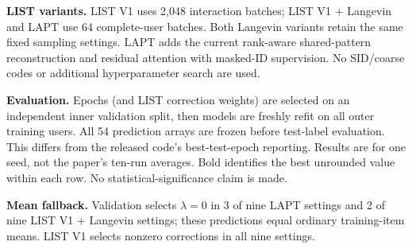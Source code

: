\documentclass[10pt]{article}
\begin{document}
\par\smallskip\noindent\textbf{LIST variants.} LIST V1 uses 2,048 interaction batches; LIST V1 + Langevin and LAPT use 64 complete-user batches. Both Langevin variants retain the same fixed sampling settings. LAPT adds the current rank-aware shared-pattern reconstruction and residual attention with masked-ID supervision. No SID/coarse codes or additional hyperparameter search are used.
\par\smallskip\noindent\textbf{Evaluation.} Epochs (and LIST correction weights) are selected on an independent inner validation split, then models are freshly refit on all outer training users. All 54 prediction arrays are frozen before test-label evaluation. This differs from the released code's best-test-epoch reporting. Results are for one seed, not the paper's ten-run averages. Bold identifies the best unrounded value within each row. No statistical-significance claim is made.
\par\smallskip\noindent\textbf{Mean fallback.} Validation selects $\lambda=0$ in 3 of nine LAPT settings and 2 of nine LIST V1 + Langevin settings; these predictions equal ordinary training-item means. LIST V1 selects nonzero corrections in all nine settings.
\end{document}
